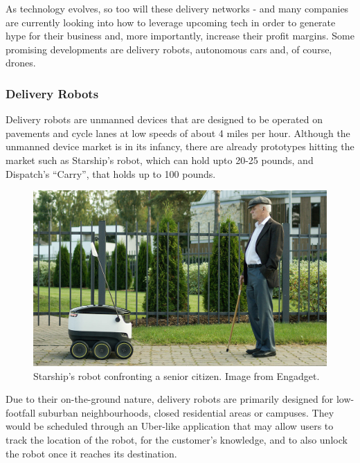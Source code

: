 \documentclass[a4paper,12pt,titlepage]{article}
\begin{document}
As technology evolves, so too will these delivery networks - and many companies are currently looking into how to leverage upcoming tech\cite{Lee2016} in order to generate hype for their business and, more importantly, increase their profit margins. Some promising developments are delivery robots, autonomous cars and, of course, drones.

\subsubsection{Delivery Robots}
Delivery robots are unmanned devices that are designed to be operated on pavements and cycle lanes at low speeds of about 4 miles per hour\cite{Lee2016}. Although the unmanned device market is in its infancy, there are already prototypes hitting the market such as Starship's robot\cite{Laris2016}, which can hold upto 20-25 pounds, and Dispatch's ``Carry''\cite{Kokalitcheva2016}, that holds up to 100 pounds.

\begin{figure}[!hbpt]
  \center
  \includegraphics[width=\linewidth]{img/starship.jpg}
  \caption{Starship's robot confronting a senior citizen. Image from Engadget\cite{Souppouris2015}.}
  \label{fig:starship_citizen}
\end{figure}

Due to their on-the-ground nature, delivery robots are primarily designed for low-footfall suburban neighbourhoods, closed residential areas or campuses. They would be scheduled through an Uber-like application that may allow users to track the location of the robot, for the customer's knowledge, and to also unlock the robot once it reaches its destination\cite{Hohenadel2015}. \\
\end{document}
